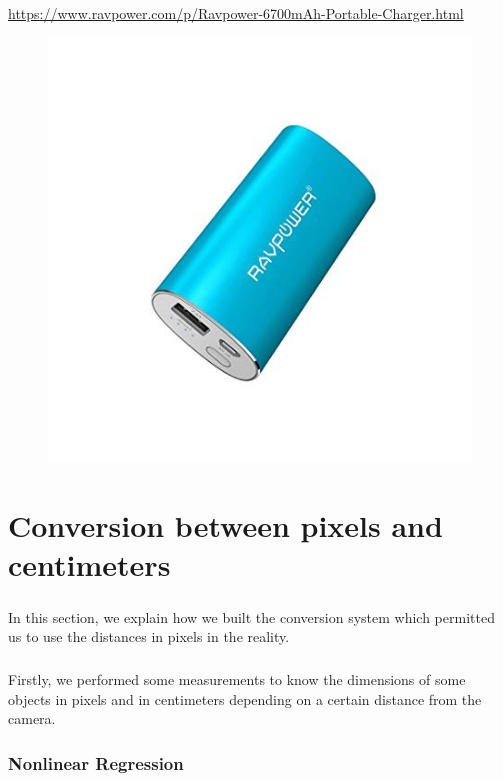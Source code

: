\documentclass[12pt]{report}
\begin{document}
	\paragraph{}
	\url{https://www.ravpower.com/p/Ravpower-6700mAh-Portable-Charger.html}
	\begin{figure}[H]
		\begin{center}
			\includegraphics[scale=0.6]{res/power.jpg}
		\end{center}
	\end{figure}
\chapter{Conversion between pixels and centimeters}
\paragraph{}
In this section, we explain how we built the conversion system which permitted us to use the distances in pixels in the reality.
\paragraph{}
Firstly, we performed some measurements to know the dimensions of some objects in pixels and in centimeters depending on a certain distance from the camera.
\subsection{Nonlinear Regression}
\end{document}

